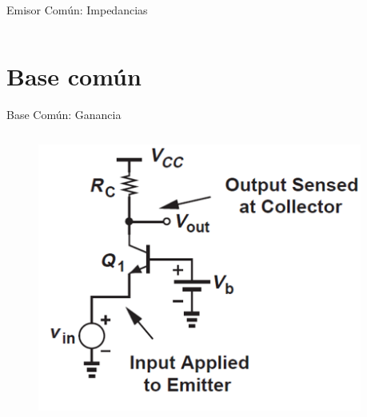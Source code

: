 \documentclass[t,aspectratio=169]{beamer}
\begin{document}
\begin{frame}{Emisor Común: Impedancias}

\begin{columns}
\begin{column}{0.5\textwidth}
\end{column}
\begin{column}{0.5\textwidth}
\end{column}
\end{columns}
    
\end{frame}


\section{Base común}
\begin{frame}{Base Común: Ganancia}

\vspace{-5mm}\begin{columns}
\begin{column}{0.5\textwidth}

\begin{figure}[H]
    \centering
    \includegraphics[width=\textwidth]{figuras/base_comun_circuito.png}
\end{figure}

\end{column}
\begin{column}{0.5\textwidth}


\end{column}
\end{columns}
\end{frame}
\end{document}
